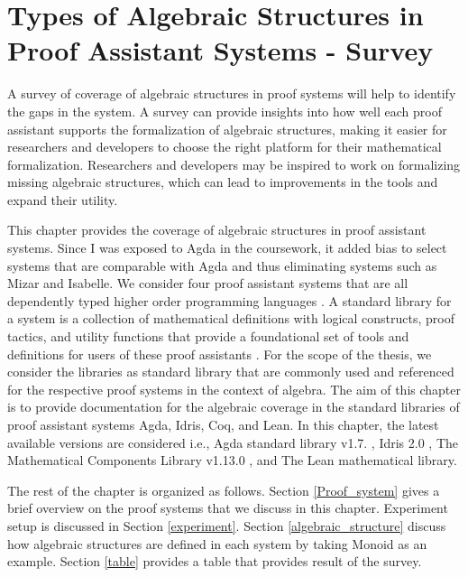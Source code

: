\chapter{Types of Algebraic Structures in Proof Assistant Systems - Survey}

A survey of coverage of algebraic structures in proof systems will help to
identify the gaps in the system. A survey can provide insights into how well
each proof assistant supports the formalization of algebraic structures, making
it easier for researchers and developers to choose the right platform for their
mathematical formalization. Researchers and developers may be inspired to work
on formalizing missing algebraic structures, which can lead to improvements in
the tools and expand their utility.

This chapter provides the coverage of algebraic structures in proof assistant
systems. Since I was exposed to Agda in the coursework, it added bias to select
systems that are comparable with Agda and thus eliminating systems such as Mizar
and Isabelle. We consider four proof assistant systems that are all dependently
typed higher order programming languages \cite{2019arXiv191203028S}. A standard
library for a system is a collection of mathematical definitions with logical
constructs, proof tactics, and utility functions that provide a foundational set
of tools and definitions for users of these proof assistants
\cite{kohlhase2021experiences}. For the scope of the thesis, we consider the
libraries as standard library that are commonly used and referenced for the
respective proof systems in the context of algebra. The aim of this chapter is
to provide documentation for the algebraic coverage in the standard libraries of
proof assistant systems Agda, Idris, Coq, and Lean. In this chapter, the latest
available versions are considered i.e., Agda standard library v1.7.
\cite{danielsson2011agda}, Idris 2.0 \cite{Brady2021Idris2Q}, The Mathematical
Components Library v1.13.0 \cite{assia_mahboubi_2021_4457887}, and The Lean
mathematical library\cite{10.1145/3372885.3373824}.

The rest of the chapter is organized as follows. Section \ref{Proof_system}
gives a brief overview on the proof systems that we discuss in this chapter.
Experiment setup is discussed in Section \ref{experiment}. Section
\ref{algebraic_structure} discuss how algebraic structures are defined in each
system by taking Monoid as an example. Section \ref{table} provides a table that
provides result of the survey.

